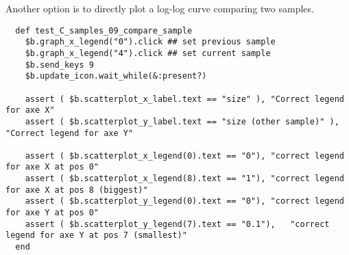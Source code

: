 Another option is to directly plot a log-log curve comparing two samples.

\begin{verbatim}
  def test_C_samples_09_compare_sample
    $b.graph_x_legend("0").click ## set previous sample
    $b.graph_x_legend("4").click ## set current sample
    $b.send_keys 9
    $b.update_icon.wait_while(&:present?)

    assert ( $b.scatterplot_x_label.text == "size" ), "Correct legend for axe X"
    assert ( $b.scatterplot_y_label.text == "size (other sample)" ), "Correct legend for axe Y"

    assert ( $b.scatterplot_x_legend(0).text == "0"), "correct legend for axe X at pos 0"
    assert ( $b.scatterplot_x_legend(8).text == "1"), "correct legend for axe X at pos 8 (biggest)"
    assert ( $b.scatterplot_y_legend(0).text == "0"), "correct legend for axe Y at pos 0"
    assert ( $b.scatterplot_y_legend(7).text == "0.1"),   "correct legend for axe Y at pos 7 (smallest)"
  end
\end{verbatim}

